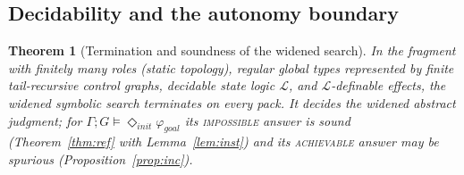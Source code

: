 \documentclass{article}
\theoremstyle{plain}
\newtheorem{theorem}{Theorem}
\theoremstyle{definition}
\newcommand{\gphi}{\varphi_{\mathit{goal}}}
\newcommand{\achinit}{\vDash\Diamond_{\mathit{init}}}
\def \bgc {}
\def \egc {}
\begin{document}
\subsection{Decidability and the autonomy boundary}
\bgc\begin{theorem}[Termination and soundness of the widened search]\label{thm:dec}
In the fragment with finitely many roles (static topology), regular global types
represented by finite tail-recursive control graphs, decidable state logic
$\mathcal L$, and $\mathcal L$-definable effects, the widened symbolic search
terminates on every pack. It decides the widened abstract judgment; for
$\Gamma;G\achinit\gphi$ its \textsc{impossible} answer is sound
(Theorem~\ref{thm:ref} with Lemma~\ref{lem:inst}) and its \textsc{achievable}
answer may be spurious (Proposition~\ref{prop:inc}).
\end{theorem}\egc
\end{document}
